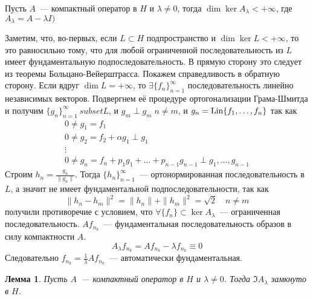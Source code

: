 \documentclass[14pt]{extarticle}
\begin{document}
\begin{Theor}
    Пусть $A$~--- компактный оператор в $H$ и $\lambda \ne 0$, тогда
    $\dim \ker A_\lambda < +\infty$, где $A_\lambda = A - \lambda I)$
\end{Theor}
\begin{Proof}
    Заметим, что, во-первых, если $L \subset H$ подпространство и $\dim \ker L
    < +\infty$, то это равносильно тому, что для любой ограниченной
    последовательность из $L$ имеет фундаментальную подпоследовательность.
    В прямую сторону это следует из теоремы Больцано-Вейерштрасса.
    Покажем справедливость в обратную сторону.
    Если вдруг $\dim L = +\infty$, то $\exists\{f_n\}_{n = 1}^\infty$
    последовательность линейно независимых векторов.
    Подвергнем её процедуре ортогонализации Грама-Шмитда и получим $\{g_n\}
    _{n = 1}^\infty \ subset L$, и $g_m \perp g_m\; n \ne m$, и $g_n = \operatorname{Lin}
    \{f_1,\dots,f_n\}$ так как
    \begin{gather*}
    0 \ne g_1 = f_1\\
    0 \ne g_2 = f_2 + \alpha g_1 \perp g_1\\
    \vdots\\
    0 \ne g_n = f_n + p_1 g_1 + \dots + p_{n - 1} g_{n - 1} \perp g_1, \dots,
    g_{n - 1}
    \end{gather*}
    Строим $h_n = \frac{g_n}{\|g_n\|}$.
    Тогда $\{h_n\}_{n = 1}^\infty$~--- ортонормированная последовательность в
    $L$, а значит не имеет фундаментальной подпоследовательности, так как
    $$
    \|h_n - h_m\|^2 = \|h_n\| + \|h_m\|^2 = \sqrt{2} \quad n \ne m
    $$
    получили противоречие с условием, что $\forall \{f_n\} \subset \ker A_
    \lambda$~--- ограниченная последовательность.
    $A f_{n_k}$~--- фундаментальная последовательность образов в силу
    компактности $A$.
    $$
    A_\lambda f_{n_k} = A f_{n_k} - \lambda f_{n_k} \equiv 0
    $$
    Следовательно $f_{n_k} = \frac{1}{\lambda}A f_{n_k}$~--- автоматически
    фундаментальная.
\end{Proof}
\newtheorem{Lemm}{Лемма}
\begin{Lemm}
    Пусть $A$~--- компактный оператор в $H$ и $\lambda \ne 0$.
    Тогда $\Im A_\lambda$ замкнуто в $H$.
\end{Lemm}
\end{document}
